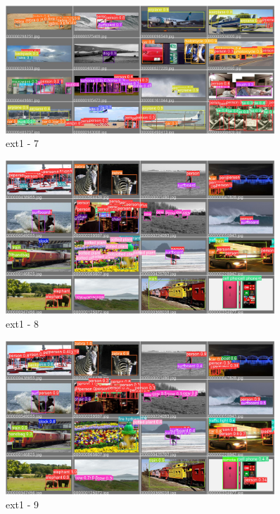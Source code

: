 \documentclass[10pt,UTF8]{ctexart}
\begin{document}
\begin{figure}[H]
\centering 
\includegraphics[width=0.90\textwidth]{ex17.jpg} 
\caption{ext1 - 7}
\label{Test}
\end{figure}

\begin{figure}[H]
\centering 
\includegraphics[width=0.90\textwidth]{ex18.jpg} 
\caption{ext1 - 8}
\label{Test}
\end{figure}

\begin{figure}[H]
\centering 
\includegraphics[width=0.90\textwidth]{ex19.jpg} 
\caption{ext1 - 9}
\label{Test}
\end{figure}
\end{document}
